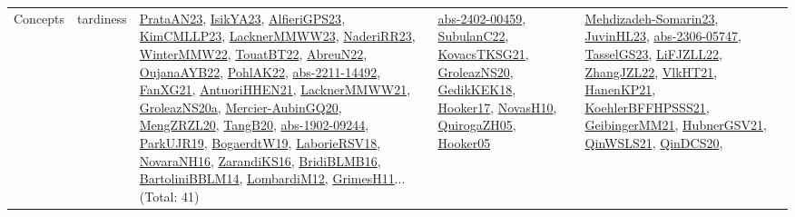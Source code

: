 {\begin{longtable}{lp{3cm}>{\raggedright}p{6cm}>{\raggedright}p{6cm}p{8cm}}
Concepts & tardiness & \href{articles/PrataAN23.pdf}{PrataAN23}\cite{PrataAN23}, \href{articles/IsikYA23.pdf}{IsikYA23}\cite{IsikYA23}, \href{articles/AlfieriGPS23.pdf}{AlfieriGPS23}\cite{AlfieriGPS23}, \href{papers/KimCMLLP23.pdf}{KimCMLLP23}\cite{KimCMLLP23}, \href{articles/LacknerMMWW23.pdf}{LacknerMMWW23}\cite{LacknerMMWW23}, \href{articles/NaderiRR23.pdf}{NaderiRR23}\cite{NaderiRR23}, \href{papers/WinterMMW22.pdf}{WinterMMW22}\cite{WinterMMW22}, \href{papers/TouatBT22.pdf}{TouatBT22}\cite{TouatBT22}, \href{articles/AbreuN22.pdf}{AbreuN22}\cite{AbreuN22}, \href{papers/OujanaAYB22.pdf}{OujanaAYB22}\cite{OujanaAYB22}, \href{articles/PohlAK22.pdf}{PohlAK22}\cite{PohlAK22}, \href{articles/abs-2211-14492.pdf}{abs-2211-14492}\cite{abs-2211-14492}, \href{articles/FanXG21.pdf}{FanXG21}\cite{FanXG21}, \href{papers/AntuoriHHEN21.pdf}{AntuoriHHEN21}\cite{AntuoriHHEN21}, \href{papers/LacknerMMWW21.pdf}{LacknerMMWW21}\cite{LacknerMMWW21}, \href{papers/GroleazNS20a.pdf}{GroleazNS20a}\cite{GroleazNS20a}, \href{papers/Mercier-AubinGQ20.pdf}{Mercier-AubinGQ20}\cite{Mercier-AubinGQ20}, \href{articles/MengZRZL20.pdf}{MengZRZL20}\cite{MengZRZL20}, \href{papers/TangB20.pdf}{TangB20}\cite{TangB20}, \href{articles/abs-1902-09244.pdf}{abs-1902-09244}\cite{abs-1902-09244}, \href{papers/ParkUJR19.pdf}{ParkUJR19}\cite{ParkUJR19}, \href{papers/BogaerdtW19.pdf}{BogaerdtW19}\cite{BogaerdtW19}, \href{articles/LaborieRSV18.pdf}{LaborieRSV18}\cite{LaborieRSV18}, \href{articles/NovaraNH16.pdf}{NovaraNH16}\cite{NovaraNH16}, \href{articles/ZarandiKS16.pdf}{ZarandiKS16}\cite{ZarandiKS16}, \href{articles/BridiBLMB16.pdf}{BridiBLMB16}\cite{BridiBLMB16}, \href{papers/BartoliniBBLM14.pdf}{BartoliniBBLM14}\cite{BartoliniBBLM14}, \href{articles/LombardiM12.pdf}{LombardiM12}\cite{LombardiM12}, \href{papers/GrimesH11.pdf}{GrimesH11}\cite{GrimesH11}... (Total: 41) & \href{articles/abs-2402-00459.pdf}{abs-2402-00459}\cite{abs-2402-00459}, \href{articles/SubulanC22.pdf}{SubulanC22}\cite{SubulanC22}, \href{papers/KovacsTKSG21.pdf}{KovacsTKSG21}\cite{KovacsTKSG21}, \href{papers/GroleazNS20.pdf}{GroleazNS20}\cite{GroleazNS20}, \href{articles/GedikKEK18.pdf}{GedikKEK18}\cite{GedikKEK18}, \href{papers/Hooker17.pdf}{Hooker17}\cite{Hooker17}, \href{articles/NovasH10.pdf}{NovasH10}\cite{NovasH10}, \href{papers/QuirogaZH05.pdf}{QuirogaZH05}\cite{QuirogaZH05}, \href{articles/Hooker05.pdf}{Hooker05}\cite{Hooker05} & \href{papers/Mehdizadeh-Somarin23.pdf}{Mehdizadeh-Somarin23}\cite{Mehdizadeh-Somarin23}, \href{papers/JuvinHL23.pdf}{JuvinHL23}\cite{JuvinHL23}, \href{articles/abs-2306-05747.pdf}{abs-2306-05747}\cite{abs-2306-05747}, \href{papers/TasselGS23.pdf}{TasselGS23}\cite{TasselGS23}, \href{papers/LiFJZLL22.pdf}{LiFJZLL22}\cite{LiFJZLL22}, \href{papers/ZhangJZL22.pdf}{ZhangJZL22}\cite{ZhangJZL22}, \href{articles/VlkHT21.pdf}{VlkHT21}\cite{VlkHT21}, \href{papers/HanenKP21.pdf}{HanenKP21}\cite{HanenKP21}, \href{articles/KoehlerBFFHPSSS21.pdf}{KoehlerBFFHPSSS21}\cite{KoehlerBFFHPSSS21}, \href{papers/GeibingerMM21.pdf}{GeibingerMM21}\cite{GeibingerMM21}, \href{articles/HubnerGSV21.pdf}{HubnerGSV21}\cite{HubnerGSV21}, \href{articles/QinWSLS21.pdf}{QinWSLS21}\cite{QinWSLS21}, \href{articles/QinDCS20.pdf}{QinDCS20}\cite{QinDCS20}, 
\end{longtable}}
